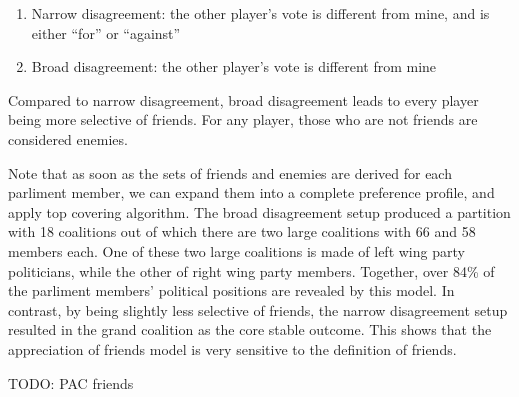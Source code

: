 \documentclass[letterpaper]{article} %
\begin{document}
\begin{enumerate}
  \item Narrow disagreement: the other player's vote is different from mine, and is either ``for'' or ``against''
  \item Broad disagreement: the other player's vote is different from mine
\end{enumerate}

Compared to narrow disagreement, broad disagreement leads to every player being more selective of friends. For any player, those who are not friends are considered enemies.

Note that as soon as the sets of friends and enemies are derived for each parliment member, we can expand them into a complete preference profile, and apply top covering algorithm. The broad disagreement setup produced a partition with 18 coalitions out of which there are two large coalitions with 66 and 58 members each. One of these two large coalitions is made of left wing party politicians, while the other of right wing party members. Together, over 84\% of the parliment members' political positions are revealed by this model. In contrast, by being slightly less selective of friends, the narrow disagreement setup resulted in the grand coalition as the core stable outcome. This shows that the appreciation of friends model is very sensitive to the definition of friends.

TODO: PAC friends



\end{document}
